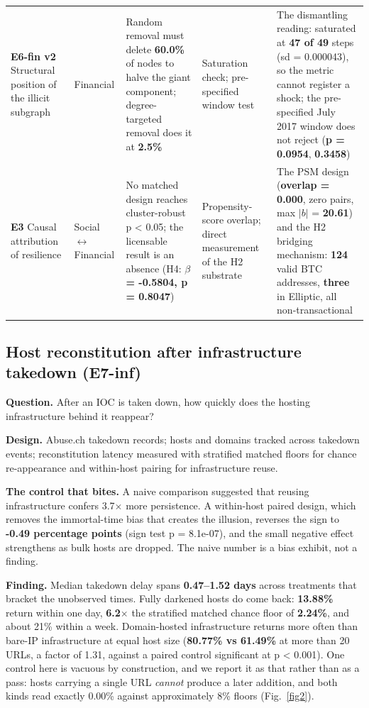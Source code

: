 \begin{table}[t]
\begin{tabular}{@{}L{1.75cm}L{1.55cm}L{4.35cm}L{3.35cm}L{5.0cm}@{}}
\textbf{E6-fin v2} Structural position of the illicit subgraph & Financial & Random removal must delete \textbf{60.0\%} of nodes to halve the giant component; degree-targeted removal does it at \textbf{2.5\%} & Saturation check; pre-specified window test & The dismantling reading: saturated at \textbf{47 of 49} steps (sd = 0.000043), so the metric cannot register a shock; the pre-specified July 2017 window does not reject (\textbf{p = 0.0954}, \textbf{0.3458})\\
\textbf{E3} Causal attribution of resilience & Social $\leftrightarrow$ Financial & No matched design reaches cluster-robust p \textless{} 0.05; the licensable result is an absence (H4: \textbf{$\beta$ = -0.5804, p = 0.8047}) & Propensity-score overlap; direct measurement of the H2 substrate & The PSM design (\textbf{overlap = 0.000}, zero pairs, max $|b|$ = \textbf{20.61}) and the H2 bridging mechanism: \textbf{124} valid BTC addresses, \textbf{three} in Elliptic, all non-transactional\\
\bottomrule
\end{tabular}
\setlength{\tabcolsep}{6pt}
\end{table}

\subsection{Host reconstitution after infrastructure takedown (E7-inf)}\label{sec:e7inf}

\textbf{Question.} After an IOC is taken down, how quickly does the hosting
infrastructure behind it reappear?

\textbf{Design.} Abuse.ch takedown records; hosts and domains tracked across
takedown events; reconstitution latency measured with stratified matched floors
for chance re-appearance and within-host pairing for infrastructure reuse.

\textbf{The control that bites.} A naive comparison suggested that reusing
infrastructure confers 3.7$\times$ more persistence. A within-host paired design,
which removes the immortal-time bias that creates the illusion, reverses the
sign to \textbf{-0.49 percentage points} (sign test p = 8.1e-07), and the small
negative effect strengthens as bulk hosts are dropped. The naive number is a
bias exhibit, not a finding.

\textbf{Finding.} Median takedown delay spans \textbf{0.47--1.52 days} across
treatments that bracket the unobserved times. Fully darkened hosts do come back:
\textbf{13.88\%} return within one day, \textbf{6.2$\times$} the stratified
matched chance floor of \textbf{2.24\%}, and about 21\% within a week.
Domain-hosted infrastructure returns more often than bare-IP infrastructure at
equal host size (\textbf{80.77\% vs 61.49\%} at more than 20 URLs, a factor of
1.31, against a paired control significant at p \textless{} 0.001). One control
here is vacuous by construction, and we report it as that rather than as a pass:
hosts carrying a single URL \emph{cannot} produce a later addition, and both
kinds read exactly 0.00\% against approximately 8\% floors (Fig.~\ref{fig2}).

